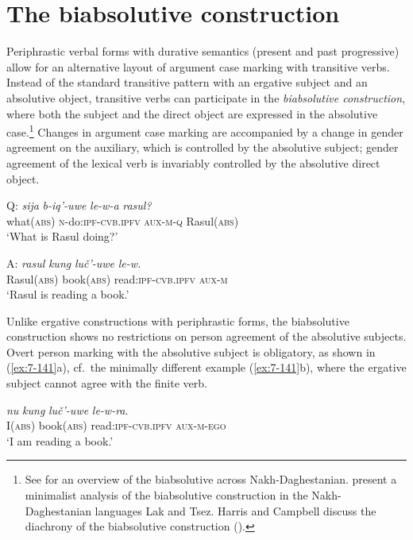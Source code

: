 ﻿\documentclass[output=paper]{langsci/langscibook}
\begin{document}
\section{The biabsolutive construction}\label{Biabsolutive-construction}

Periphrastic verbal forms with durative semantics (present and past
progressive) allow for an alternative layout of argument case marking
with transitive verbs. Instead of the standard transitive pattern with
an ergative subject and an absolutive object, transitive verbs can
participate in the \emph{biabsolutive construction}, where
both the subject and the direct object are expressed in the absolutive
case.\footnote{See \citet{forker2012} for an overview of the biabsolutive
  across Nakh-Daghestanian. \citet{gagliardi-etal2014} present a minimalist
  analysis of the biabsolutive construction in the Nakh-Daghestanian
  languages Lak and Tsez. Harris and Campbell discuss the diachrony of
  the biabsolutive construction (\citeyear[187–189]{harris-campbell1995}).} Changes in argument
case marking are accompanied by a change in gender agreement on the
auxiliary, which is controlled by the absolutive subject; gender agreement
of the lexical verb is invariably controlled by the absolutive direct
object.

\ea %
\gll Q: \emph{sija} \emph{b-iq'-uwe} \emph{le-w-a} \emph{rasul?}\\
{} what(\textsc{abs}) \textsc{n}-do:\textsc{ipf}-\textsc{cvb.ipfv} \textsc{aux}-\textsc{m}-\textsc{q} Rasul(\textsc{abs})\\
\glt `What is Rasul doing?'

\gll A: \emph{rasul} \emph{kung} \emph{luč'-uwe} \emph{le-w.}\\
{} Rasul(\textsc{abs}) book(\textsc{abs}) read:\textsc{ipf}-\textsc{cvb.ipfv} \textsc{aux}-\textsc{m}\\
\glt `Rasul is reading a book.'
\z

Unlike ergative constructions with periphrastic forms, the biabsolutive
construction shows no restrictions on person agreement of the absolutive
subjects. Overt person marking with the absolutive subject is
obligatory, as shown in (\ref{ex:7-141}a), cf.\ the minimally different example
(\ref{ex:7-141}b), where the ergative subject cannot agree with the finite verb.

\ea\label{ex:7-141}
\ea %
\gll \emph{nu} \emph{kung} \emph{luč'-uwe} \emph{le-w-ra}.\\
I(\textsc{abs}) book(\textsc{abs}) read:\textsc{ipf}-\textsc{cvb.ipfv} \textsc{aux}-\textsc{m}-\textsc{ego}\\
\glt `I am reading a book.'
\end{document}
